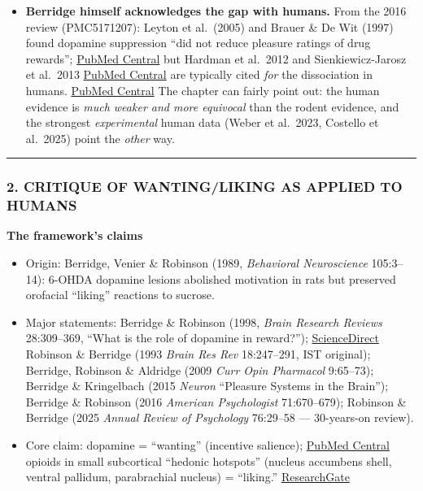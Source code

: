 \begin{itemize}
\item
  \textbf{Berridge himself acknowledges the gap with humans.} From the 2016 review (PMC5171207): Leyton et al.~(2005) and Brauer \& De Wit (1997) found dopamine suppression ``did not reduce pleasure ratings of drug rewards''; \href{https://pmc.ncbi.nlm.nih.gov/articles/PMC5171207/}{PubMed Central} but Hardman et al.~2012 and Sienkiewicz-Jarosz et al.~2013 \href{https://pmc.ncbi.nlm.nih.gov/articles/PMC5171207/}{PubMed Central} are typically cited \emph{for} the dissociation in humans. \href{https://pmc.ncbi.nlm.nih.gov/articles/PMC5171207/}{PubMed Central} The chapter can fairly point out: the human evidence is \emph{much weaker and more equivocal} than the rodent evidence, and the strongest \emph{experimental} human data (Weber et al.~2023, Costello et al.~2025) point the \emph{other} way.
\end{itemize}

\begin{center}\rule{0.5\linewidth}{0.5pt}\end{center}

\subsubsection{2. CRITIQUE OF WANTING/LIKING AS APPLIED TO HUMANS}\label{07_pleasure_and_self-critique-of-wantingliking-as-applied-to-humans}

\textbf{The framework's claims}

\begin{itemize}
\tightlist
\item
  Origin: Berridge, Venier \& Robinson (1989, \emph{Behavioral Neuroscience} 105:3--14): 6-OHDA dopamine lesions abolished motivation in rats but preserved orofacial ``liking'' reactions to sucrose.
\item
  Major statements: Berridge \& Robinson (1998, \emph{Brain Research Reviews} 28:309--369, ``What is the role of dopamine in reward?''); \href{https://www.sciencedirect.com/science/article/abs/pii/104457659290011P}{ScienceDirect} Robinson \& Berridge (1993 \emph{Brain Res Rev} 18:247--291, IST original); Berridge, Robinson \& Aldridge (2009 \emph{Curr Opin Pharmacol} 9:65--73); Berridge \& Kringelbach (2015 \emph{Neuron} ``Pleasure Systems in the Brain''); Berridge \& Robinson (2016 \emph{American Psychologist} 71:670--679); Robinson \& Berridge (2025 \emph{Annual Review of Psychology} 76:29--58 --- 30-years-on review).
\item
  Core claim: dopamine = ``wanting'' (incentive salience); \href{https://pmc.ncbi.nlm.nih.gov/articles/PMC3274778/}{PubMed Central} opioids in small subcortical ``hedonic hotspots'' (nucleus accumbens shell, ventral pallidum, parabrachial nucleus) = ``liking.'' \href{https://www.researchgate.net/publication/5539913_Berridge_KC_Kringelbach_ML_Affective_neuroscience_of_pleasure_reward_in_humans_and_animals_Psychopharmacology_Berl_199_457-480}{ResearchGate}
\end{itemize}

